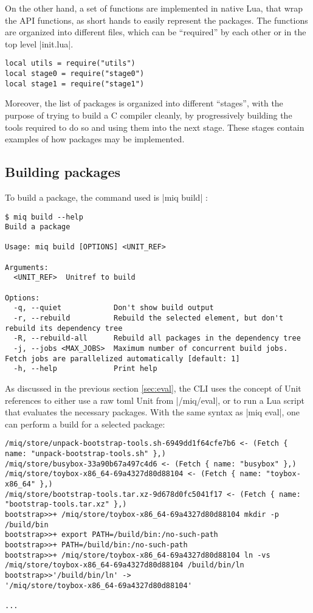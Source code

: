On the other hand, a set of functions are implemented in
native Lua, that wrap the API functions, as short hands to
easily represent the packages. The functions are organized
into different files, which can be ``required'' by each
other or in the top level |init.lua|.

\begin{verbatim}
local utils = require("utils")
local stage0 = require("stage0")
local stage1 = require("stage1")
\end{verbatim}

Moreover, the list of packages is organized into different
``stages'', with the purpose of trying to build a C compiler
cleanly, by progressively building the tools required to do
so and using them into the next stage. These stages contain
examples of how packages may be implemented.


\subsection{Building packages}

To build a package, the command used is |miq build| :
\begin{verbatim}
$ miq build --help
Build a package

Usage: miq build [OPTIONS] <UNIT_REF>

Arguments:
  <UNIT_REF>  Unitref to build

Options:
  -q, --quiet            Don't show build output
  -r, --rebuild          Rebuild the selected element, but don't rebuild its dependency tree
  -R, --rebuild-all      Rebuild all packages in the dependency tree
  -j, --jobs <MAX_JOBS>  Maximum number of concurrent build jobs. Fetch jobs are parallelized automatically [default: 1]
  -h, --help             Print help
\end{verbatim}

As discussed in the previous section \ref{sec:eval}, the
\ac{CLI} uses the concept of Unit references to either use a
raw toml Unit from |/miq/eval|, or to run a Lua script that
evaluates the necessary packages. With the same syntax as
|miq eval|, one can perform a build for a selected package:

\begin{verbatim}
/miq/store/unpack-bootstrap-tools.sh-6949dd1f64cfe7b6 <- (Fetch { name: "unpack-bootstrap-tools.sh" },)
/miq/store/busybox-33a90b67a497c4d6 <- (Fetch { name: "busybox" },)
/miq/store/toybox-x86_64-69a4327d80d88104 <- (Fetch { name: "toybox-x86_64" },)
/miq/store/bootstrap-tools.tar.xz-9d678d0fc5041f17 <- (Fetch { name: "bootstrap-tools.tar.xz" },)
bootstrap>>+ /miq/store/toybox-x86_64-69a4327d80d88104 mkdir -p /build/bin
bootstrap>>+ export PATH=/build/bin:/no-such-path
bootstrap>>+ PATH=/build/bin:/no-such-path
bootstrap>>+ /miq/store/toybox-x86_64-69a4327d80d88104 ln -vs /miq/store/toybox-x86_64-69a4327d80d88104 /build/bin/ln
bootstrap>>'/build/bin/ln' ->
'/miq/store/toybox-x86_64-69a4327d80d88104'

...
\end{verbatim}

